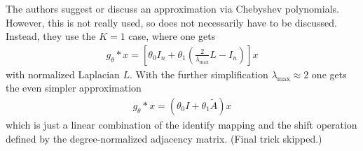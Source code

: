 \documentclass[12pt,a4paper]{article}
\begin{document}
The authors suggest or discuss an approximation via Chebyshev polynomials. However, this is not really used, so does not necessarily have to be discussed. Instead, they use the $K=1$ case, where one gets
\begin{align}
g_\theta \ast x = \left[ \theta_0  I_n+ \theta_1 \left(\frac {2}{\lambda_{\text{max}}} L - I_n\right) \right] x
\end{align}
with normalized Laplacian $L$. With the further  simplification $\lambda_{\text{max}}\approx 2$ one gets the even simpler approximation 
\begin{align}
g_\theta \ast x = (\theta_0 I + \theta_1 \tilde A) x
\end{align}
which is just a linear combination of the identify mapping and the shift operation defined by the degree-normalized adjacency matrix.  (Final trick skipped.)




\end{document}
